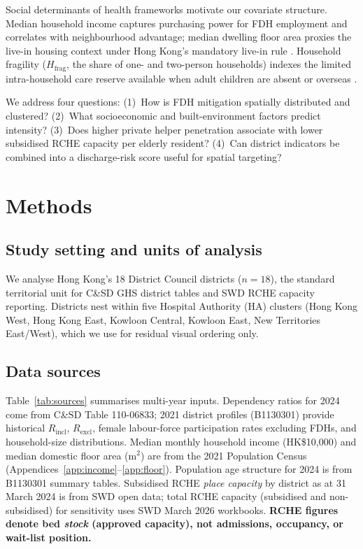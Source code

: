 \documentclass[11pt,a4paper]{article}
\begin{document}
Social determinants of health frameworks motivate our covariate structure. Median household income captures purchasing power for FDH employment and correlates with neighbourhood advantage; median dwelling floor area proxies the live-in housing context under Hong Kong's mandatory live-in rule \citep{chui2017}. Household fragility ($H_{\mathrm{frag}}$, the share of one- and two-person households) indexes the limited intra-household care reserve available when adult children are absent or overseas \citep{census2021}.

We address four questions: (1)~How is FDH mitigation spatially distributed and clustered? (2)~What socioeconomic and built-environment factors predict intensity? (3)~Does higher private helper penetration associate with lower subsidised RCHE capacity per elderly resident? (4)~Can district indicators be combined into a discharge-risk score useful for spatial targeting?

\section{Methods}

\subsection{Study setting and units of analysis}

We analyse Hong Kong's 18 District Council districts ($n{=}18$), the standard territorial unit for C\&SD GHS district tables and SWD RCHE capacity reporting. Districts nest within five Hospital Authority (HA) clusters (Hong Kong West, Hong Kong East, Kowloon Central, Kowloon East, New Territories East/West), which we use for residual visual ordering only.

\subsection{Data sources}

Table~\ref{tab:sources} summarises multi-year inputs. Dependency ratios for 2024 come from C\&SD Table 110-06833; 2021 district profiles (B1130301) provide historical $R_{\mathrm{incl}}$, $R_{\mathrm{excl}}$, female labour-force participation rates excluding FDHs, and household-size distributions. Median monthly household income (HK\$10{,}000) and median domestic floor area (m$^2$) are from the 2021 Population Census (Appendices~\ref{app:income}--\ref{app:floor}). Population age structure for 2024 is from B1130301 summary tables. Subsidised RCHE \emph{place capacity} by district as at 31 March 2024 is from SWD open data; total RCHE capacity (subsidised and non-subsidised) for sensitivity uses SWD March 2026 workbooks. \textbf{RCHE figures denote bed \emph{stock} (approved capacity), not admissions, occupancy, or wait-list position.}
\end{document}
